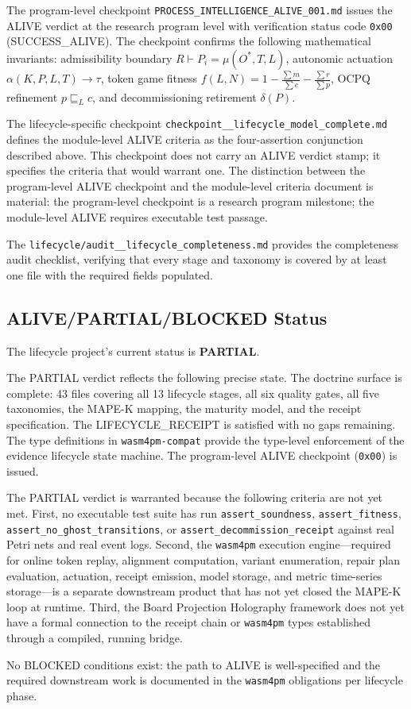 The program-level checkpoint \texttt{PROCESS\_INTELLIGENCE\_ALIVE\_001.md} issues the
ALIVE verdict at the research program level with verification status code \texttt{0x00}
(SUCCESS\_ALIVE). The checkpoint confirms the following mathematical invariants:
admissibility boundary $R \vdash P_i = \mu(O^*, T, L)$, autonomic actuation
$\alpha(K, P, L, T) \to \tau$, token game fitness
$f(L, N) = 1 - \frac{\sum m}{\sum c} - \frac{\sum r}{\sum p}$, OCPQ refinement
$p \sqsubseteq_L c$, and decommissioning retirement $\delta(P)$.

The lifecycle-specific checkpoint \texttt{checkpoint\_\_lifecycle\_model\_complete.md}
defines the module-level ALIVE criteria as the four-assertion conjunction described
above. This checkpoint does not carry an ALIVE verdict stamp; it specifies the criteria
that would warrant one. The distinction between the program-level ALIVE checkpoint and
the module-level criteria document is material: the program-level checkpoint is a
research program milestone; the module-level ALIVE requires executable test passage.

The \texttt{lifecycle/audit\_\_lifecycle\_completeness.md} provides the completeness
audit checklist, verifying that every stage and taxonomy is covered by at least one
file with the required fields populated.

\subsection{ALIVE/PARTIAL/BLOCKED Status}
\label{sec:lifecycle-evidence-status}

The lifecycle project's current status is \textbf{PARTIAL}.

The PARTIAL verdict reflects the following precise state. The doctrine surface is
complete: 43 files covering all 13 lifecycle stages, all six quality gates, all five
taxonomies, the MAPE-K mapping, the maturity model, and the receipt specification.
The LIFECYCLE\_RECEIPT is satisfied with no gaps remaining. The type definitions in
\texttt{wasm4pm-compat} provide the type-level enforcement of the evidence lifecycle
state machine. The program-level ALIVE checkpoint (\texttt{0x00}) is issued.

The PARTIAL verdict is warranted because the following criteria are not yet met. First,
no executable test suite has run \texttt{assert\_soundness}, \texttt{assert\_fitness},
\texttt{assert\_no\_ghost\_transitions}, or \texttt{assert\_decommission\_receipt}
against real Petri nets and real event logs. Second, the \texttt{wasm4pm} execution
engine---required for online token replay, alignment computation, variant enumeration,
repair plan evaluation, actuation, receipt emission, model storage, and metric
time-series storage---is a separate downstream product that has not yet closed the
MAPE-K loop at runtime. Third, the Board Projection Holography framework does not yet
have a formal connection to the receipt chain or \texttt{wasm4pm} types established
through a compiled, running bridge.

No BLOCKED conditions exist: the path to ALIVE is well-specified and the required
downstream work is documented in the \texttt{wasm4pm} obligations per lifecycle phase.
